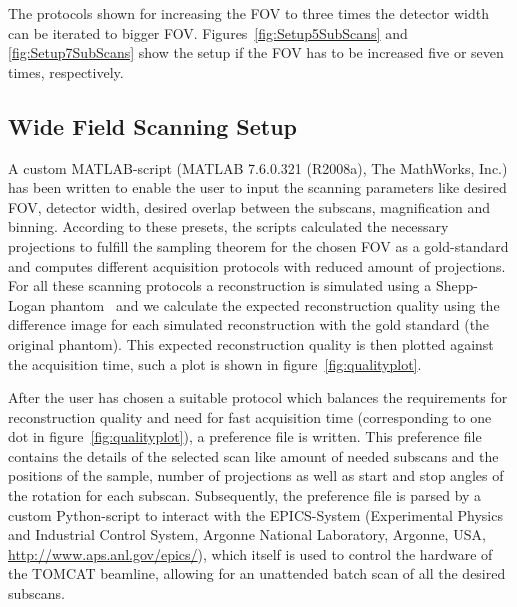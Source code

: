 The protocols shown for increasing the FOV to three times the detector width can be iterated to bigger FOV. Figures~\ref{fig:Setup5SubScans} and \ref{fig:Setup7SubScans} show the setup if the FOV has to be increased five or seven times, respectively.

\begin{figure*}[htp]
	\centering%
	\caption{Setup; desired FOV and two variants of covering the desired FOV with 25 independent small scans or 5 subscans.}%
	\label{fig:Setup5SubScans}%
\end{figure*}

\begin{figure*}[htp]
	\centering%
	\caption{Setup; desired FOV and two variants of covering the desired FOV with 49 independent small scans or 7 subscans.}%
	\label{fig:Setup7SubScans}%
\end{figure*}
\cbend

\subsection{Wide Field Scanning Setup}
\label{subsec:wfs-setup}%

\cbstart
A custom MATLAB-script (MATLAB\textsuperscript{\textregistered} 7.6.0.321 (R2008a), The MathWorks, Inc.) has been written to enable the user to input the scanning parameters like desired FOV, detector width, desired overlap between the subscans, magnification and binning. According to these presets, the scripts calculated the necessary projections to fulfill the sampling theorem for the chosen FOV as a gold-standard and computes different acquisition protocols with reduced amount of projections. For all these scanning protocols a reconstruction is simulated using a Shepp-Logan phantom~\cite{Shepp1974} and we calculate the expected reconstruction quality using the difference image for each simulated reconstruction with the gold standard (the original phantom). This expected reconstruction quality is then plotted against the acquisition time, such a plot is shown in figure~\ref{fig:qualityplot}.

After the user has chosen a suitable protocol which balances the requirements for reconstruction quality and need for fast acquisition time (corresponding to one dot in figure~\ref{fig:qualityplot}), a preference file is written. This preference file contains the details of the selected scan like amount of needed subscans and the positions of the sample, number of projections as well as start and stop angles of the rotation for each subscan. Subsequently, the preference file is parsed by a custom Python-script to interact with the EPICS-System (Experimental Physics and Industrial Control System, Argonne National Laboratory, Argonne, USA, \url{http://www.aps.anl.gov/epics/}), which itself is used to control the hardware of the TOMCAT beamline, allowing for an unattended batch scan of all the desired subscans.
\cbend

